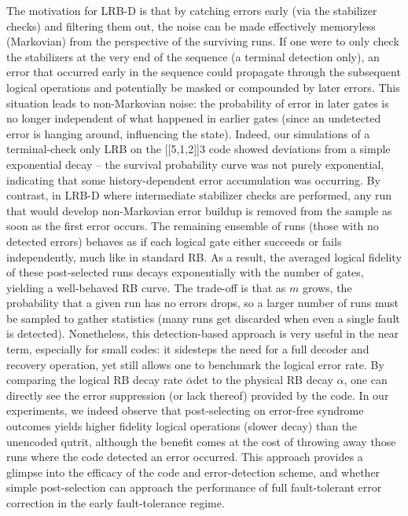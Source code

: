 The motivation for LRB-D is that by catching errors early (via the
stabilizer checks) and filtering them out, the noise can be made
effectively memoryless (Markovian) from the perspective of the surviving
runs. If one were to only check the stabilizers at the very end of the
sequence (a terminal detection only), an error that occurred early in
the sequence could propagate through the subsequent logical operations
and potentially be masked or compounded by later errors. This situation
leads to non-Markovian noise: the probability of error in later gates is
no longer independent of what happened in earlier gates (since an
undetected error is hanging around, influencing the state). Indeed, our
simulations of a terminal-check only LRB on the [[5,1,2]]$3$ code showed
deviations from a simple exponential decay – the survival probability
curve was not purely exponential, indicating that some history-dependent
error accumulation was occurring.\cite{Ceasura2022NonExpLRB} By
contrast, in LRB-D where intermediate stabilizer checks are performed,
any run that would develop non-Markovian error buildup is removed from
the sample as soon as the first error occurs. The remaining ensemble of
runs (those with no detected errors) behaves as if each logical gate
either succeeds or fails independently, much like in standard RB. As a
result, the averaged logical fidelity of these post-selected runs decays
exponentially with the number of gates, yielding a well-behaved RB
curve.\cite{Wallman2018RB} The trade-off is that as $m$ grows, the
probability that a given run has no errors drops, so a larger number of
runs must be sampled to gather statistics (many runs get discarded when
even a single fault is detected). Nonetheless, this detection-based
approach is very useful in the near term, especially for small codes: it
sidesteps the need for a full decoder and recovery operation, yet still
allows one to benchmark the logical error rate. By comparing the logical
RB decay rate $\bar{\alpha}{\text{det}}$ to the physical RB decay
$\alpha$, one can directly see the error suppression (or lack thereof)
provided by the code. In our experiments, we indeed observe that
post-selecting on error-free syndrome outcomes yields higher fidelity
logical operations (slower decay) than the unencoded qutrit, although
the benefit comes at the cost of throwing away those runs where the code
detected an error occurred. This approach provides a glimpse into the
efficacy of the code and error-detection scheme, and whether simple
post-selection can approach the performance of full fault-tolerant error
correction in the early fault-tolerance regime.

